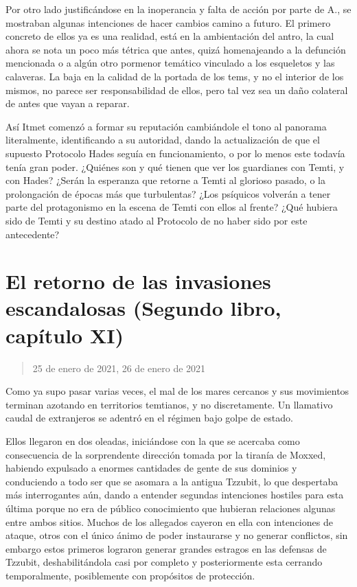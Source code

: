 \documentclass[
]{book}
\begin{document}
Por otro lado justificándose en la inoperancia y falta de acción por parte de A., se mostraban algunas intenciones de hacer cambios camino a futuro. El primero concreto de ellos ya es una realidad, está en la ambientación del antro, la cual ahora se nota un poco más tétrica que antes, quizá homenajeando a la defunción mencionada o a algún otro pormenor temático vinculado a los esqueletos y las calaveras. La baja en la calidad de la portada de los tems, y no el interior de los mismos, no parece ser responsabilidad de ellos, pero tal vez sea un daño colateral de antes que vayan a reparar.

Así Itmet comenzó a formar su reputación cambiándole el tono al panorama literalmente, identificando a su autoridad, dando la actualización de que el supuesto Protocolo Hades seguía en funcionamiento, o por lo menos este todavía tenía gran poder. ¿Quiénes son y qué tienen que ver los guardianes con Temti, y con Hades? ¿Serán la esperanza que retorne a Temti al glorioso pasado, o la prolongación de épocas más que turbulentas? ¿Los psíquicos volverán a tener parte del protagonismo en la escena de Temti con ellos al frente? ¿Qué hubiera sido de Temti y su destino atado al Protocolo de no haber sido por este antecedente?

\hypertarget{el-retorno-de-las-invasiones-escandalosas-segundo-libro-capuxedtulo-xi}{%
\section{El retorno de las invasiones escandalosas (Segundo libro, capítulo XI)}\label{el-retorno-de-las-invasiones-escandalosas-segundo-libro-capuxedtulo-xi}}

\begin{quote}
25 de enero de 2021, 26 de enero de 2021
\end{quote}

Como ya supo pasar varias veces, el mal de los mares cercanos y sus movimientos terminan azotando en territorios temtianos, y no discretamente. Un llamativo caudal de extranjeros se adentró en el régimen bajo golpe de estado.

Ellos llegaron en dos oleadas, iniciándose con la que se acercaba como consecuencia de la sorprendente dirección tomada por la tiranía de Moxxed, habiendo expulsado a enormes cantidades de gente de sus dominios y conduciendo a todo ser que se asomara a la antigua Tzzubit, lo que despertaba más interrogantes aún, dando a entender segundas intenciones hostiles para esta última porque no era de público conocimiento que hubieran relaciones algunas entre ambos sitios. Muchos de los allegados cayeron en ella con intenciones de ataque, otros con el único ánimo de poder instaurarse y no generar conflictos, sin embargo estos primeros lograron generar grandes estragos en las defensas de Tzzubit, deshabilitándola casi por completo y posteriormente esta cerrando temporalmente, posiblemente con propósitos de protección.
\end{document}
